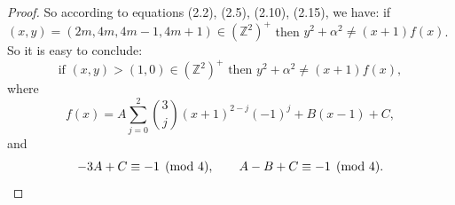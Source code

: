 \documentclass[10pt,a4paper]{amsart}
\begin{document}
\begin{proof}
So according to equations (2.2), (2.5), (2.10), (2.15), we have: if $(x,y)=(2m,4m,4m-1,4m+1)\in(\mathbb{Z}^2)^+$ then $y^2+\alpha^2\ne(x+1)f(x)$. So it is easy to conclude:
\[
\text{if } (x,y)>(1,0)\in(\mathbb{Z}^2)^+ \text{ then } y^2+\alpha^2 \ne (x+1)f(x),
\]
where
\[
f(x) = A\sum_{j=0}^2\binom3j(x+1)^{2-j}(-1)^j + B(x-1)+C,
\]
and
\[
-3A+C\equiv -1\pmod4, \qquad A-B+C\equiv -1\pmod4. \qedhere
\]
\end{proof}
\end{document}

